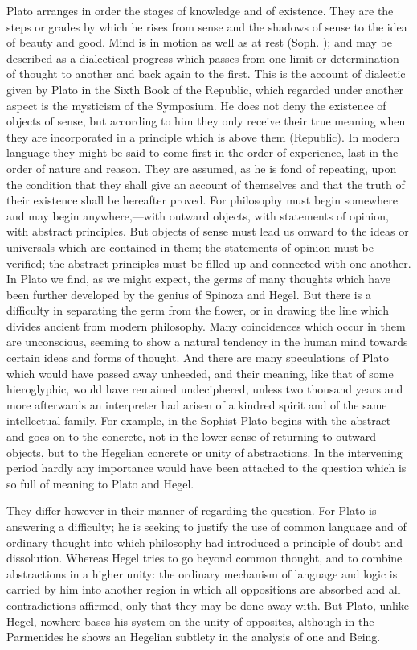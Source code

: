 \documentclass[11pt,letter]{article}
\begin{document}
\par  Plato arranges in order the stages of knowledge and of existence. They are the steps or grades by which he rises from sense and the shadows of sense to the idea of beauty and good. Mind is in motion as well as at rest (Soph. ); and may be described as a dialectical progress which passes from one limit or determination of thought to another and back again to the first. This is the account of dialectic given by Plato in the Sixth Book of the Republic, which regarded under another aspect is the mysticism of the Symposium. He does not deny the existence of objects of sense, but according to him they only receive their true meaning when they are incorporated in a principle which is above them (Republic). In modern language they might be said to come first in the order of experience, last in the order of nature and reason. They are assumed, as he is fond of repeating, upon the condition that they shall give an account of themselves and that the truth of their existence shall be hereafter proved. For philosophy must begin somewhere and may begin anywhere,—with outward objects, with statements of opinion, with abstract principles. But objects of sense must lead us onward to the ideas or universals which are contained in them; the statements of opinion must be verified; the abstract principles must be filled up and connected with one another. In Plato we find, as we might expect, the germs of many thoughts which have been further developed by the genius of Spinoza and Hegel. But there is a difficulty in separating the germ from the flower, or in drawing the line which divides ancient from modern philosophy. Many coincidences which occur in them are unconscious, seeming to show a natural tendency in the human mind towards certain ideas and forms of thought. And there are many speculations of Plato which would have passed away unheeded, and their meaning, like that of some hieroglyphic, would have remained undeciphered, unless two thousand years and more afterwards an interpreter had arisen of a kindred spirit and of the same intellectual family. For example, in the Sophist Plato begins with the abstract and goes on to the concrete, not in the lower sense of returning to outward objects, but to the Hegelian concrete or unity of abstractions. In the intervening period hardly any importance would have been attached to the question which is so full of meaning to Plato and Hegel.

\par  They differ however in their manner of regarding the question. For Plato is answering a difficulty; he is seeking to justify the use of common language and of ordinary thought into which philosophy had introduced a principle of doubt and dissolution. Whereas Hegel tries to go beyond common thought, and to combine abstractions in a higher unity: the ordinary mechanism of language and logic is carried by him into another region in which all oppositions are absorbed and all contradictions affirmed, only that they may be done away with. But Plato, unlike Hegel, nowhere bases his system on the unity of opposites, although in the Parmenides he shows an Hegelian subtlety in the analysis of one and Being.
\end{document}
